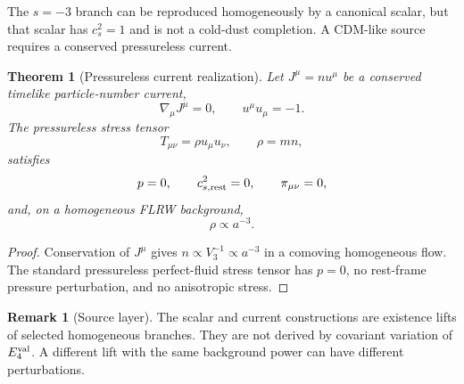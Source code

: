 \documentclass[aps,prd,preprint,onecolumn,nofootinbib,superscriptaddress,showkeys]{revtex4-2}
\numberwithin{equation}{section}
\theoremstyle{definition}
\newtheorem{remark}{Remark}[section]
\theoremstyle{plain}
\newtheorem{theorem}{Theorem}[section]
\begin{document}
The \(s=-3\) branch can be reproduced homogeneously by a canonical scalar, but that scalar has \(c_s^2=1\) and is not a cold-dust completion.  A CDM-like source requires a conserved pressureless current.

\begin{theorem}[Pressureless current realization]
Let \(J^\mu=nu^\mu\) be a conserved timelike particle-number current,
\begin{equation}
\nabla_\mu J^\mu=0,
\qquad
u^\mu u_\mu=-1.
\end{equation}
The pressureless stress tensor
\begin{equation}
T_{\mu\nu}=\rho u_\mu u_\nu,
\qquad
\rho=mn,
\end{equation}
satisfies
\begin{equation}
p=0,
\qquad
c_{s,\rm rest}^2=0,
\qquad
\pi_{\mu\nu}=0,
\end{equation}
and, on a homogeneous FLRW background,
\begin{equation}
\rho\propto a^{-3}.
\end{equation}
\end{theorem}

\begin{proof}
Conservation of \(J^\mu\) gives \(n\propto V_3^{-1}\propto a^{-3}\) in a comoving homogeneous flow.  The standard pressureless perfect-fluid stress tensor has \(p=0\), no rest-frame pressure perturbation, and no anisotropic stress.
\end{proof}

\begin{remark}[Source layer]
The scalar and current constructions are existence lifts of selected homogeneous branches.  They are not derived by covariant variation of \(E_4^{\rm val}\).  A different lift with the same background power can have different perturbations.
\end{remark}
\end{document}
